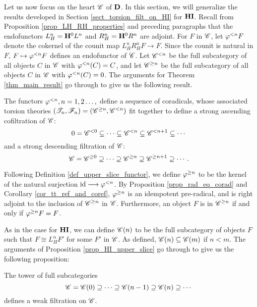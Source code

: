 Let us now focus on the heart $\Cat{C}$ of $\DCat$. In this 
section, we will generalize the results developed in Section
\ref{sect_torsion_filt_on_HI} for $\HI$. Recall from Proposition 
\ref{prop_LH_RH_properties} and preceding paragraphs that the 
endofunctors $L_H^n = \HH^0 L^n$ and $R_H^n = \HH^0 R^n$ are 
adjoint. For $F$ in $\Cat{C}$, let $\corad{n} F$ denote the 
cokernel of the counit map $L_H^n R_H^n F \to F$. Since the counit
is natural in $F$, $F \mapsto \corad{n}F$ defines an endofunctor 
of $\Cat{C}$. Let $\Corad{n}{\Cat{C}}$ be the full subcategory of 
all objects $C$ in $\Cat{C}$ with $\corad{n}(C) = C$, and let 
$\Prerad{n}{\Cat{C}}$ be the full subcategory of all objects $C$ 
in $\Cat{C}$ with $\corad{n}(C) = 0$. The arguments for Theorem 
\ref{thm_main_result} go through to give us the following result. 

\begin{thm}\label{thm_sum_heart}
The functors $\corad{n}, n = 1, 2\dots,$ define a sequence of
coradicals, whose associated torsion theories $(\Cat{T}_n,
\Cat{F}_n) = (\Prerad{n}{\Cat{C}}, \Corad{n}{\Cat{C}})$ fit together
to define a strong ascending cofiltration of $\Cat{C}$:
\[
0 = \Corad{0}{\Cat{C}} \subseteq \cdots \subseteq \Corad{n}{\Cat{C}}
   \subseteq \Corad{n + 1}{\Cat{C}} \subseteq \cdots
\]
and a strong descending filtration of $\Cat{C}$:
\[
\Cat{C} = \Prerad{0}{\Cat{C}} \supseteq \cdots \supseteq \Prerad{n}{\Cat{C}}
\supseteq \Prerad{n + 1}{\Cat{C}} \supseteq \cdots.
\]
\end{thm}

Following Definition \ref{def_upper_slice_functor}, we define 
$\prerad{n}$ to be the kernel of the natural surjection $\id \to 
\corad{n}$. By Proposition \ref{prop_rad_eq_corad} and Corollary 
\ref{cor_tt_ref_and_coref}, $\prerad{n}$ is an idempotent 
pre-radical, and is right adjoint to the inclusion of 
$\Prerad{n}{\Cat{C}}$ in $\Cat{C}$. Furthermore, an object $F$
is in $\Prerad{n}{\Cat{C}}$ if and only if $\prerad{n}{F} = F$.

As in the case for $\HI$, we can define $\SGFilt{n}{\Cat{C}}$ to be
the full subcategory of objects $F$ such that $F \cong L_H^nF'$
for some $F'$ in $\Cat{C}$. As defined, $\SGFilt{n}{\Cat{C}}
\subseteq \SGFilt{m}{\Cat{C}}$ if $n < m$. The arguments of 
Proposition \ref{prop_HI_upper_slice} go through to give us the 
following proposition:

\begin{prop}
The tower of full subcategories
\[
\Cat{C} = \SGFilt{0}{\Cat{C}} \supseteq \cdots \supseteq \SGFilt{n - 1}{\Cat{C}}
\supseteq \SGFilt{n}{\Cat{C}} \supseteq \cdots
\]
defines a weak filtration on $\Cat{C}$.
\end{prop}


